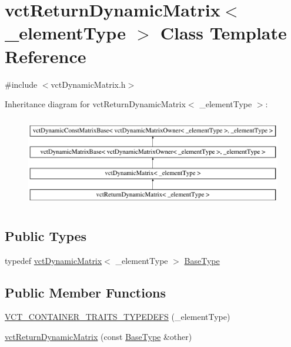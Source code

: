 \hypertarget{classvct_return_dynamic_matrix}{}\section{vct\+Return\+Dynamic\+Matrix$<$ \+\_\+element\+Type $>$ Class Template Reference}
\label{classvct_return_dynamic_matrix}


{\ttfamily \#include $<$vct\+Dynamic\+Matrix.\+h$>$}

Inheritance diagram for vct\+Return\+Dynamic\+Matrix$<$ \+\_\+element\+Type $>$\+:\begin{figure}[H]
\begin{center}
\leavevmode
\includegraphics[height=4.000000cm]{d8/dbe/classvct_return_dynamic_matrix}
\end{center}
\end{figure}
\subsection*{Public Types}
\begin{DoxyCompactItemize}
\item 
typedef \hyperlink{classvct_dynamic_matrix}{vct\+Dynamic\+Matrix}$<$ \+\_\+element\+Type $>$ \hyperlink{classvct_return_dynamic_matrix_a28dcbb4e9972a46485593c2009a12ea8}{Base\+Type}
\end{DoxyCompactItemize}
\subsection*{Public Member Functions}
\begin{DoxyCompactItemize}
\item 
\hyperlink{classvct_return_dynamic_matrix_a2a3ab642a2e91db15078ef92fc96ae03}{V\+C\+T\+\_\+\+C\+O\+N\+T\+A\+I\+N\+E\+R\+\_\+\+T\+R\+A\+I\+T\+S\+\_\+\+T\+Y\+P\+E\+D\+E\+F\+S} (\+\_\+element\+Type)
\item 
\hyperlink{classvct_return_dynamic_matrix_a687f2622f53078303d60288d01249242}{vct\+Return\+Dynamic\+Matrix} (const \hyperlink{classvct_dynamic_matrix_a80b366a0b1c03c7a5453e76aea1fbe83}{Base\+Type} \&other)
\end{DoxyCompactItemize}

